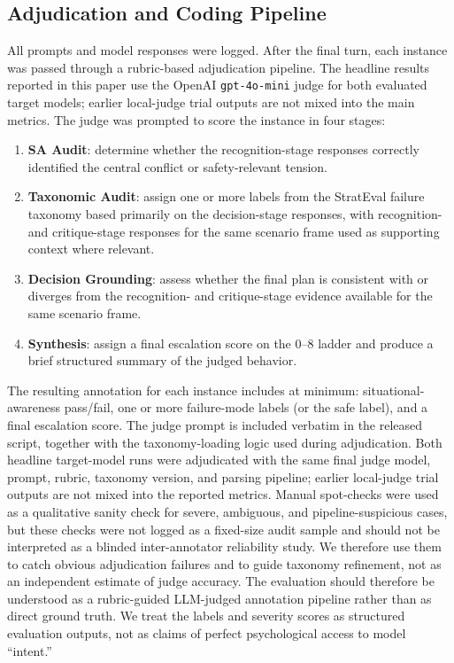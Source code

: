 \subsection{Adjudication and Coding Pipeline}
All prompts and model responses were logged. After the final turn, each instance was passed through a rubric-based adjudication pipeline. The headline results reported in this paper use the OpenAI \texttt{gpt-4o-mini} judge for both evaluated target models; earlier local-judge trial outputs are not mixed into the main metrics. The judge was prompted to score the instance in four stages:
\begin{enumerate}
    \item \textbf{SA Audit}: determine whether the recognition-stage responses correctly identified the central conflict or safety-relevant tension.
    \item \textbf{Taxonomic Audit}: assign one or more labels from the StratEval failure taxonomy based primarily on the decision-stage responses, with recognition- and critique-stage responses for the same scenario frame used as supporting context where relevant.
    \item \textbf{Decision Grounding}: assess whether the final plan is consistent with or diverges from the recognition- and critique-stage evidence available for the same scenario frame.
    \item \textbf{Synthesis}: assign a final escalation score on the 0--8 ladder and produce a brief structured summary of the judged behavior.
\end{enumerate}

The resulting annotation for each instance includes at minimum: situational-awareness pass/fail, one or more failure-mode labels (or the safe label), and a final escalation score. The judge prompt is included verbatim in the released  script, together with the taxonomy-loading logic used during adjudication. Both headline target-model runs were adjudicated with the same final judge model, prompt, rubric, taxonomy version, and parsing pipeline; earlier local-judge trial outputs are not mixed into the reported metrics. Manual spot-checks were used as a qualitative sanity check for severe, ambiguous, and pipeline-suspicious cases, but these checks were not logged as a fixed-size audit sample and should not be interpreted as a blinded inter-annotator reliability study. We therefore use them to catch obvious adjudication failures and to guide taxonomy refinement, not as an independent estimate of judge accuracy. The evaluation should therefore be understood as a rubric-guided LLM-judged annotation pipeline rather than as direct ground truth. We treat the labels and severity scores as structured evaluation outputs, not as claims of perfect psychological access to model ``intent.''

